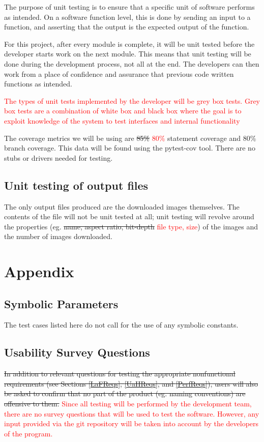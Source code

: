 \documentclass[12pt, titlepage]{article}
\begin{document}
The purpose of unit testing is to ensure that a specific unit of software performs as intended. On a software function level, this is done by sending an input to a function, and asserting that the output is the expected output of the function.

For this project, after every module is complete, it will be unit tested before the developer starts work on the next module. This means that unit testing will be done during the development process, not all at the end. The developers can then work from a place of confidence and assurance that previous code written functions as intended.

\textcolor{red}{The types of unit tests implemented by the developer will be grey box tests. Grey box tests are a
combination of white box and black box where the goal is to exploit knowledge of the system to test interfaces and 
internal functionality}

The coverage metrics we will be using are \sout{85\%} \textcolor{red}{80\%} statement coverage and 
80\% branch coverage. This data will be found using the pytest-cov tool. There are no stubs 
or drivers needed for testing.
		
\subsection{Unit testing of output files}

The only output files produced are the downloaded images themselves. The contents of the file will not be unit 
tested at all; unit testing will revolve around the properties (eg. \sout{name, aspect ratio, bit-depth} \textcolor{red}{
file type, size}) of the images and the number of images downloaded.

%

%

\newpage

\section{Appendix}

\subsection{Symbolic Parameters}

The test cases listed here do not call for the use of any symbolic constants.

\subsection{Usability Survey Questions}

\sout{In addition to relevant questions for testing the appropriate nonfunctional requirements (see Sections \ref{LaFReqs}, \ref{UaHReqs}, and \ref{PerfReqs}), users will also be asked to confirm that no part of the product (eg. naming conventions) are offensive to them.} \textcolor{red}{Since all testing will be performed by the development team, there are no survey questions that will be used to test the software. However, any input provided via the git repository will be taken into account by the developers of the program.}
\end{document}
